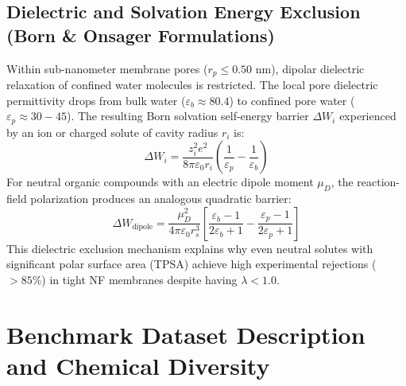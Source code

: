 \documentclass[11pt]{article}
\begin{document}
\subsection{Dielectric and Solvation Energy Exclusion (Born \& Onsager Formulations)}
\label{sec:dielectric_exclusion}
Within sub-nanometer membrane pores ($r_p \le 0.50\text{ nm}$), dipolar dielectric relaxation of confined water molecules is restricted. The local pore dielectric permittivity drops from bulk water ($\varepsilon_b \approx 80.4$) to confined pore water ($\varepsilon_p \approx 30 - 45$). The resulting Born solvation self-energy barrier $\Delta W_i$ experienced by an ion or charged solute of cavity radius $r_i$ is:
\begin{equation}
\Delta W_i = \frac{z_i^2 e^2}{8 \pi \varepsilon_0 r_i} \left( \frac{1}{\varepsilon_p} - \frac{1}{\varepsilon_b} \right)
\label{eq:s_born_energy}
\end{equation}
For neutral organic compounds with an electric dipole moment $\mu_D$, the reaction-field polarization produces an analogous quadratic barrier:
\begin{equation}
\Delta W_{\text{dipole}} = \frac{\mu_D^2}{4 \pi \varepsilon_0 r_s^3} \left[ \frac{\varepsilon_b - 1}{2\varepsilon_b + 1} - \frac{\varepsilon_p - 1}{2\varepsilon_p + 1} \right]
\label{eq:s_onsager_energy}
\end{equation}
This dielectric exclusion mechanism explains why even neutral solutes with significant polar surface area (TPSA) achieve high experimental rejections ($>85\%$) in tight NF membranes despite having $\lambda < 1.0$.

\newpage

\section{Benchmark Dataset Description and Chemical Diversity}
\label{sec:dataset}
\end{document}
